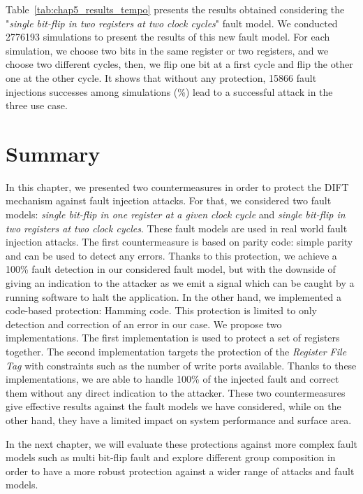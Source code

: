 Table~\ref{tab:chap5_results_tempo} presents the results obtained considering the "\textit{single bit-flip in two registers at two clock cycles}" fault model.  We conducted \num{2776193} simulations to present the results of this new fault model. For each simulation, we choose two bits in the same register or two registers, and we choose two different cycles, then, we flip one bit at a first cycle and flip the other one at the other cycle.
It shows that without any protection, \num{15866} fault injections successes among  simulations (\%) lead to a successful attack in the three use case.


\section{Summary}
In this chapter, we presented two countermeasures in order to protect the DIFT mechanism against fault injection attacks. For that, we considered two fault models: \textit{single bit-flip in one register at a given clock cycle} and \textit{single bit-flip in two registers at two clock cycles}. These fault models are used in real world fault injection attacks.
The first countermeasure is based on parity code: simple parity and can be used to detect any errors. Thanks to this protection, we achieve a 100\% fault detection in our considered fault model, but with the downside of giving an indication to the attacker as we emit a signal which can be caught by a running software to halt the application. In the other hand, we implemented a code-based protection: Hamming code. This protection is limited to only detection and correction of an error in our case. We propose two implementations. The first implementation is used to protect a set of registers together. The second implementation targets the protection of the \textit{Register File Tag} with constraints such as the number of write ports available. Thanks to these implementations, we are able to handle 100\% of the injected fault and correct them without any direct indication to the attacker.
These two countermeasures give effective results against the fault models we have considered, while on the other hand, they have a limited impact on system performance and surface area.

In the next chapter, we will evaluate these protections against more complex fault models such as multi bit-flip fault and explore different group composition in order to have a more robust protection against a wider range of attacks and fault models.

